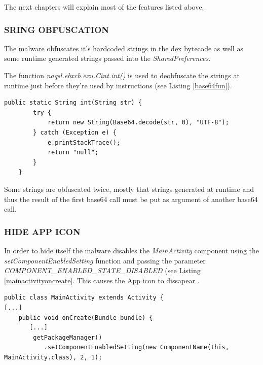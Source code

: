 \documentclass[10pt,titlepage]{article}
\begin{document}
The next chapters will explain most of the features listed above.



\newpage
\subsubsection{SRING OBFUSCATION} \label{stringobf}

The malware obfuscates it's hardcoded strings in the dex bytecode as well as some runtime generated strings passed into the \textit{SharedPreferences}.

The function \textit{naqsl.ebxcb.exu.Cint.int()} is used to deobfuscate the strings at runtime just before they're used by instructions (see Listing \ref{base64fun}).

\begin{lstlisting}[label=base64fun,caption=The function \textit{naqsl.ebxcb.exu.Cint.int()} deobfuscates the given string using the \textit{android.util.Base64.decode()} function.,frame=tb]
    public static String int(String str) {
        try {
            return new String(Base64.decode(str, 0), "UTF-8");
        } catch (Exception e) {
            e.printStackTrace();
            return "null";
        }
    }
\end{lstlisting}


Some strings are obfuscated twice, mostly that strings generated at runtime and thus the result of the first base64 call must be put as argument of another base64 call.



\subsubsection{HIDE APP ICON} \label{hideapp}
In order to hide itself the malware disables the \textit{MainActivity} component using the \textit{setComponentEnabledSetting} function and passing the parameter \textit{COMPONENT\_ENABLED\_STATE\_DISABLED} (see Listing \ref{mainactivityoncreate}. This causes the App icon to dissapear \cite[reference/android/content/pm/PackageManager]{AndroidDev}.

\begin{lstlisting}[label=mainactivityoncreate,caption=\textit{MainActivity.onCreate} calls \textit{setComponentEnabledSetting} with \textit{COMPONENT\_ENABLED\_STATE\_DISABLED} parameter in order to let the App icon disappear in the launcher.,frame=tb]
public class MainActivity extends Activity {
[...]
    public void onCreate(Bundle bundle) {
       [...]
        getPackageManager()
           .setComponentEnabledSetting(new ComponentName(this, MainActivity.class), 2, 1);
\end{lstlisting}
\end{document}
